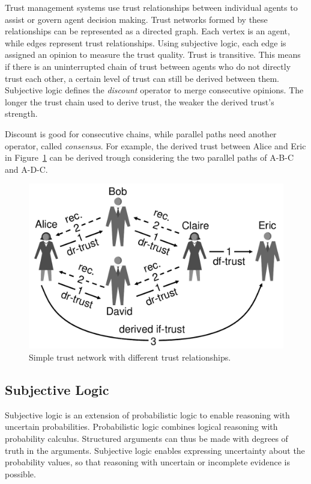 \documentclass[%
    ]{\PathToTumTemplate/thesis/tum_thesis}
\begin{document}
Trust management systems use trust relationships between individual agents to assist or govern agent decision making.
Trust networks formed by these relationships can be represented as a directed graph.\cite{josang_trust_2006,josang_trust_2007}
Each vertex is an agent, while edges represent trust relationships.
Using subjective logic, each edge is assigned an opinion to measure the trust quality.
Trust is transitive.
This means if there is an uninterrupted chain of trust between agents who do not directly trust each other, a certain level of trust can still be derived between them.
Subjective logic defines the \emph{discount} operator to merge consecutive opinions.
The longer the trust chain used to derive trust, the weaker the derived trust's strength.

Discount is good for consecutive chains, while parallel paths need another operator, called \emph{consensus}.
For example, the derived trust between Alice and Eric in Figure~\ref{fig:trust-network} can be derived trough considering the two parallel paths of A-B-C and A-D-C.

\begin{figure}[tbp]
\centerline{\includegraphics[width=0.6\linewidth]{../thirdparty_images/trust_network_josang.png}}
\caption{Simple trust network with different trust relationships. \cite{josang_trust_2006}}
\label{fig:trust-network}
\end{figure}



\subsection{Subjective Logic}
Subjective logic is an extension of probabilistic logic to enable reasoning with uncertain probabilities\cite{josang_subjective_2016,josang_trust_2006}.
Probabilistic logic combines logical reasoning with probability calculus.
Structured arguments can thus be made with degrees of truth in the arguments.
Subjective logic enables expressing uncertainty about the probability values, so that reasoning with uncertain or incomplete evidence is possible.
\end{document}

